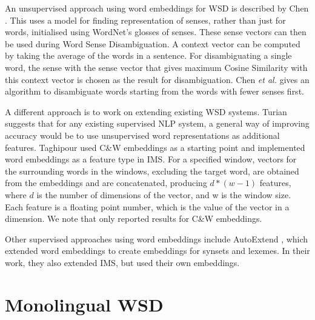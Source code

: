 \documentclass[11pt]{article}
\begin{document}
An unsupervised approach using word embeddings for WSD is described by Chen . This uses a model for finding representation of senses, rather than just for words, initialised using WordNet's glosses of senses. These sense vectors can then be used during Word Sense Disambiguation. A context vector can be computed by taking the average of the words in a sentence. For disambiguating a single word, the sense with the sense vector that gives maximum Cosine Similarity with this context vector is chosen as the result for disambiguation. Chen {\it et al.} gives an algorithm to disambiguate words starting from the words with fewer senses first. 

A different approach is to work on extending existing WSD systems. Turian  suggests that for any existing supervised NLP system, a general way of improving accuracy would be to use unsupervised word representations as additional features. Taghipour  used C\&W embeddings as a starting point and implemented word embeddings as a feature type in IMS. For a specified window, vectors for the surrounding words in the windows, excluding the target word, are obtained from the embeddings and are concatenated, producing $d * (w-1)$ features, where $d$ is the number of dimensions of the vector, and w is the window size. Each feature is a floating point number, which is the value of the vector in a dimension. We note that \cite{Taghipour15} only reported results for C\&W embeddings. 

Other supervised approaches using word embeddings include AutoExtend \cite{rothe2015autoextend}, which extended word embeddings to create embeddings for synsets and lexemes. In their work, they also extended IMS, but used their own embeddings. \\





\section{Monolingual WSD}
\label{section:monolingual}
\end{document}
